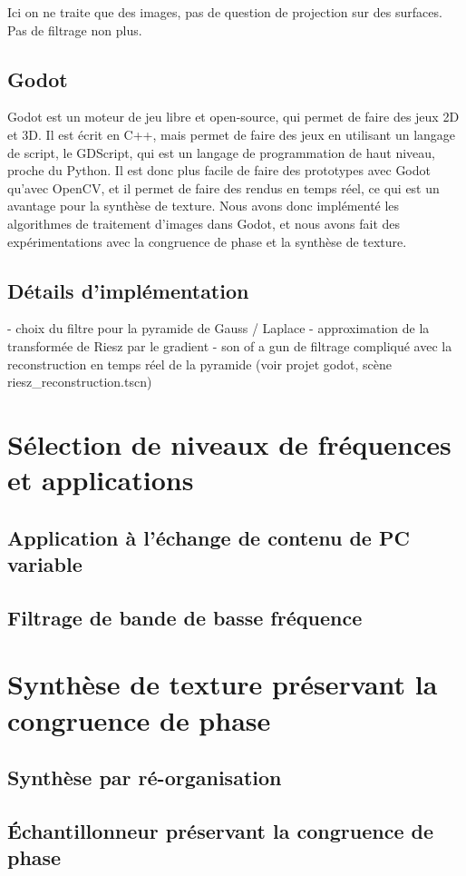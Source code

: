 Ici on ne traite que des images, pas de question de projection sur des surfaces. Pas de filtrage non plus.

\subsection{Godot}

Godot est un moteur de jeu libre et open-source, qui permet de faire des jeux 2D et 3D. Il est écrit en C++, mais permet de faire des jeux en utilisant un langage de script, le GDScript, qui est un langage de programmation de haut niveau, proche du Python. Il est donc plus facile de faire des prototypes avec Godot qu'avec OpenCV, et il permet de faire des rendus en temps réel, ce qui est un avantage pour la synthèse de texture. Nous avons donc implémenté les algorithmes de traitement d'images dans Godot, et nous avons fait des expérimentations avec la congruence de phase et la synthèse de texture.

\subsection{Détails d'implémentation}
- choix du filtre pour la pyramide de Gauss / Laplace
- approximation de la transformée de Riesz par le gradient
- son of a gun de filtrage compliqué avec la reconstruction en temps réel de la pyramide (voir projet godot, scène riesz\_reconstruction.tscn)

\section{Sélection de niveaux de fréquences et applications}

\subsection{Application à l'échange de contenu de PC variable}

\subsection{Filtrage de bande de basse fréquence}

\section{Synthèse de texture préservant la congruence de phase}

\subsection{Synthèse par ré-organisation}

\subsection{Échantillonneur préservant la congruence de phase}